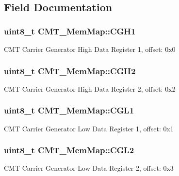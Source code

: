 \subsection{Field Documentation}
\hypertarget{struct_c_m_t___mem_map_a5efaf7b63ca9b1c492c633304e306dfa}{}
\subsubsection[{C\+G\+H1}]{\setlength{\rightskip}{0pt plus 5cm}uint8\+\_\+t C\+M\+T\+\_\+\+Mem\+Map\+::\+C\+G\+H1}\label{struct_c_m_t___mem_map_a5efaf7b63ca9b1c492c633304e306dfa}
C\+M\+T Carrier Generator High Data Register 1, offset\+: 0x0 \hypertarget{struct_c_m_t___mem_map_ae61900f68e5537b44f02af4f79a902e4}{}
\subsubsection[{C\+G\+H2}]{\setlength{\rightskip}{0pt plus 5cm}uint8\+\_\+t C\+M\+T\+\_\+\+Mem\+Map\+::\+C\+G\+H2}\label{struct_c_m_t___mem_map_ae61900f68e5537b44f02af4f79a902e4}
C\+M\+T Carrier Generator High Data Register 2, offset\+: 0x2 \hypertarget{struct_c_m_t___mem_map_a3251aaf1799b7c991993412230df664b}{}
\subsubsection[{C\+G\+L1}]{\setlength{\rightskip}{0pt plus 5cm}uint8\+\_\+t C\+M\+T\+\_\+\+Mem\+Map\+::\+C\+G\+L1}\label{struct_c_m_t___mem_map_a3251aaf1799b7c991993412230df664b}
C\+M\+T Carrier Generator Low Data Register 1, offset\+: 0x1 \hypertarget{struct_c_m_t___mem_map_ae37d0c89ef9e59676774e958d5e96153}{}
\subsubsection[{C\+G\+L2}]{\setlength{\rightskip}{0pt plus 5cm}uint8\+\_\+t C\+M\+T\+\_\+\+Mem\+Map\+::\+C\+G\+L2}\label{struct_c_m_t___mem_map_ae37d0c89ef9e59676774e958d5e96153}
C\+M\+T Carrier Generator Low Data Register 2, offset\+: 0x3 \hypertarget{struct_c_m_t___mem_map_a6771f22304d3dc09e2c1df31985a1f2a}{}
